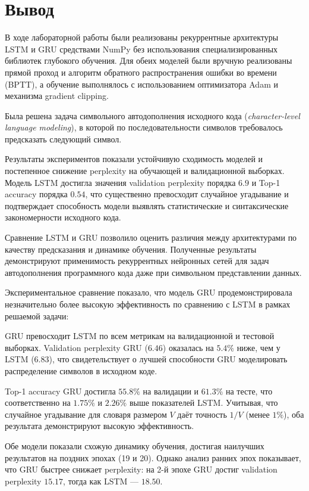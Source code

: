 \section{Вывод}

В ходе лабораторной работы были реализованы рекуррентные архитектуры LSTM и GRU средствами NumPy без использования специализированных библиотек глубокого обучения. Для обеих моделей были вручную реализованы прямой проход и алгоритм обратного распространения ошибки во времени (BPTT), а обучение выполнялось с использованием оптимизатора Adam и механизма gradient clipping.

Была решена задача символьного автодополнения исходного кода (\textit{character-level language modeling}), в которой по последовательности символов требовалось предсказать следующий символ.

Результаты экспериментов показали устойчивую сходимость моделей и постепенное снижение perplexity на обучающей и валидационной выборках. Модель LSTM достигла значения validation perplexity порядка $6.9$ и Top-1 accuracy порядка $0.54$, что существенно превосходит случайное угадывание и подтверждает способность модели выявлять статистические и синтаксические закономерности исходного кода.

Сравнение LSTM и GRU позволило оценить различия между архитектурами по качеству предсказания и динамике обучения. Полученные результаты демонстрируют применимость рекуррентных нейронных сетей для задач автодополнения программного кода даже при символьном представлении данных.

Экспериментальное сравнение показало, что модель GRU продемонстрировала незначительно более высокую эффективность по сравнению с LSTM в рамках решаемой задачи:

GRU превосходит LSTM по всем метрикам на валидационной и тестовой выборках. Validation perplexity GRU ($6.46$) оказалась на $5.4\%$ ниже, чем у LSTM ($6.83$), что свидетельствует о лучшей способности GRU моделировать распределение символов в исходном коде.

Top-1 accuracy GRU достигла $55.8\%$ на валидации и $61.3\%$ на тесте, что соответственно на $1.75\%$ и $2.26\%$ выше показателей LSTM. Учитывая, что случайное угадывание для словаря размером $V$ даёт точность $1/V$ (менее $1\%$), оба результата демонстрируют высокую эффективность.

Обе модели показали схожую динамику обучения, достигая наилучших результатов на поздних эпохах (19 и 20). Однако анализ ранних эпох показывает, что GRU быстрее снижает perplexity: на 2-й эпохе GRU достиг validation perplexity $15.17$, тогда как LSTM — $18.50$.

